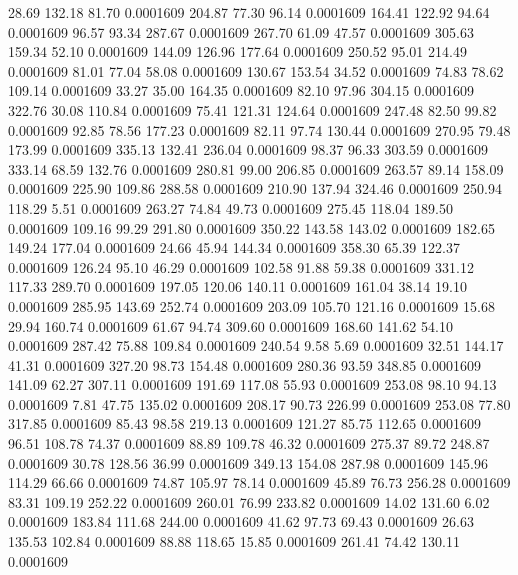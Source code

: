   28.69  132.18   81.70   0.0001609
 204.87   77.30   96.14   0.0001609
 164.41  122.92   94.64   0.0001609
  96.57   93.34  287.67   0.0001609
 267.70   61.09   47.57   0.0001609
 305.63  159.34   52.10   0.0001609
 144.09  126.96  177.64   0.0001609
 250.52   95.01  214.49   0.0001609
  81.01   77.04   58.08   0.0001609
 130.67  153.54   34.52   0.0001609
  74.83   78.62  109.14   0.0001609
  33.27   35.00  164.35   0.0001609
  82.10   97.96  304.15   0.0001609
 322.76   30.08  110.84   0.0001609
  75.41  121.31  124.64   0.0001609
 247.48   82.50   99.82   0.0001609
  92.85   78.56  177.23   0.0001609
  82.11   97.74  130.44   0.0001609
 270.95   79.48  173.99   0.0001609
 335.13  132.41  236.04   0.0001609
  98.37   96.33  303.59   0.0001609
 333.14   68.59  132.76   0.0001609
 280.81   99.00  206.85   0.0001609
 263.57   89.14  158.09   0.0001609
 225.90  109.86  288.58   0.0001609
 210.90  137.94  324.46   0.0001609
 250.94  118.29    5.51   0.0001609
 263.27   74.84   49.73   0.0001609
 275.45  118.04  189.50   0.0001609
 109.16   99.29  291.80   0.0001609
 350.22  143.58  143.02   0.0001609
 182.65  149.24  177.04   0.0001609
  24.66   45.94  144.34   0.0001609
 358.30   65.39  122.37   0.0001609
 126.24   95.10   46.29   0.0001609
 102.58   91.88   59.38   0.0001609
 331.12  117.33  289.70   0.0001609
 197.05  120.06  140.11   0.0001609
 161.04   38.14   19.10   0.0001609
 285.95  143.69  252.74   0.0001609
 203.09  105.70  121.16   0.0001609
  15.68   29.94  160.74   0.0001609
  61.67   94.74  309.60   0.0001609
 168.60  141.62   54.10   0.0001609
 287.42   75.88  109.84   0.0001609
 240.54    9.58    5.69   0.0001609
  32.51  144.17   41.31   0.0001609
 327.20   98.73  154.48   0.0001609
 280.36   93.59  348.85   0.0001609
 141.09   62.27  307.11   0.0001609
 191.69  117.08   55.93   0.0001609
 253.08   98.10   94.13   0.0001609
   7.81   47.75  135.02   0.0001609
 208.17   90.73  226.99   0.0001609
 253.08   77.80  317.85   0.0001609
  85.43   98.58  219.13   0.0001609
 121.27   85.75  112.65   0.0001609
  96.51  108.78   74.37   0.0001609
  88.89  109.78   46.32   0.0001609
 275.37   89.72  248.87   0.0001609
  30.78  128.56   36.99   0.0001609
 349.13  154.08  287.98   0.0001609
 145.96  114.29   66.66   0.0001609
  74.87  105.97   78.14   0.0001609
  45.89   76.73  256.28   0.0001609
  83.31  109.19  252.22   0.0001609
 260.01   76.99  233.82   0.0001609
  14.02  131.60    6.02   0.0001609
 183.84  111.68  244.00   0.0001609
  41.62   97.73   69.43   0.0001609
  26.63  135.53  102.84   0.0001609
  88.88  118.65   15.85   0.0001609
 261.41   74.42  130.11   0.0001609
